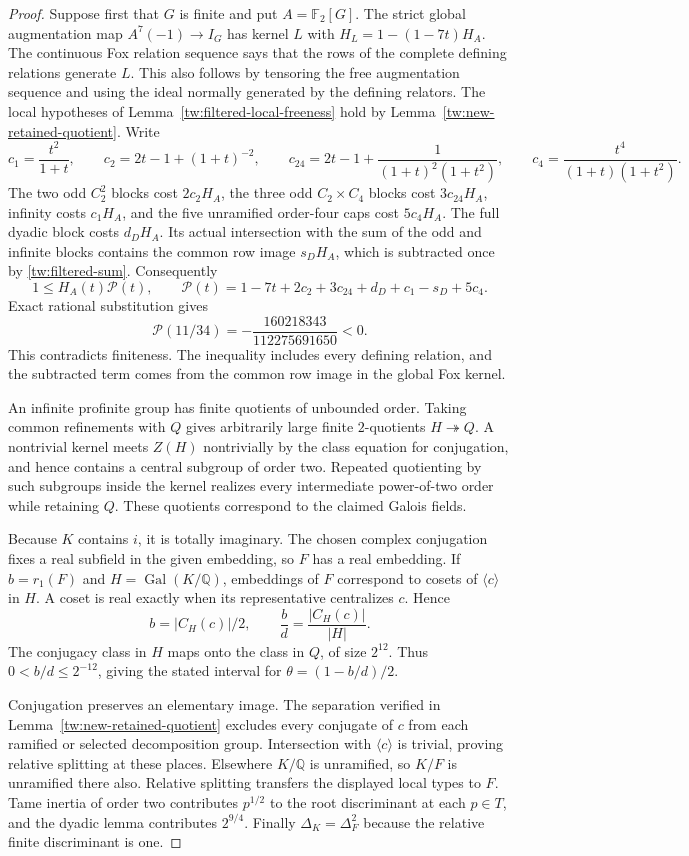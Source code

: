 \begin{proof}
Suppose first that $G$ is finite and put $A=\mathbb F_2[G]$.
The strict global augmentation map $A^7(-1)\to I_G$ has kernel $L$ with
$H_L=1-(1-7t)H_A$. The continuous Fox relation sequence says that the
rows of the complete defining relations generate $L$. This also follows
by tensoring the free augmentation sequence and using the ideal normally
generated by the defining relators.
The local hypotheses of Lemma~\ref{tw:filtered-local-freeness} hold by
Lemma~\ref{tw:new-retained-quotient}. Write
\[
 c_1=\frac{t^2}{1+t},\qquad c_2=2t-1+(1+t)^{-2},\qquad
 c_{24}=2t-1+\frac1{(1+t)^2(1+t^2)},\qquad
 c_4=\frac{t^4}{(1+t)(1+t^2)}.
\]
The two odd $C_2^2$ blocks cost $2c_2H_A$, the three odd
$C_2\times C_4$ blocks cost $3c_{24}H_A$, infinity costs $c_1H_A$,
and the five unramified order-four caps cost $5c_4H_A$.
The full dyadic block costs $d_DH_A$. Its actual intersection with the
sum of the odd and infinite blocks contains the common row image
$s_DH_A$, which is subtracted once by \eqref{tw:filtered-sum}.
Consequently
\[
 1\le H_A(t)\mathcal P(t),\qquad
 \mathcal P(t)=1-7t+2c_2+3c_{24}+d_D+c_1-s_D+5c_4.
\]
Exact rational substitution gives
\[
 \mathcal P(11/34)=-\frac{160218343}{112275691650}<0.
\]
This contradicts finiteness. The inequality includes every defining
relation, and the subtracted term comes from the common row image in the
global Fox kernel.

An infinite profinite group has finite quotients of unbounded order.
Taking common refinements with $Q$ gives arbitrarily large finite
$2$-quotients $H\twoheadrightarrow Q$. A nontrivial kernel meets $Z(H)$
nontrivially by the class equation for conjugation, and hence contains a
central subgroup of order two. Repeated quotienting by such subgroups
inside the kernel realizes every intermediate power-of-two order while
retaining $Q$. These quotients correspond to the claimed Galois fields.

Because $K$ contains $i$, it is totally imaginary. The chosen complex
conjugation fixes a real subfield in the given embedding, so $F$ has a
real embedding. If $b=r_1(F)$ and $H=\operatorname{Gal}(K/\mathbb Q)$,
embeddings of $F$ correspond to cosets of $\langle c\rangle$ in $H$.
A coset is real exactly when its representative centralizes $c$. Hence
\[
 b=|C_H(c)|/2,\qquad \frac bd=\frac{|C_H(c)|}{|H|}.
\]
The conjugacy class in $H$ maps onto the class in $Q$, of size $2^{12}$.
Thus $0<b/d\le2^{-12}$, giving the stated interval for
$\theta=(1-b/d)/2$.

Conjugation preserves an elementary image. The separation verified in
Lemma~\ref{tw:new-retained-quotient} excludes every conjugate
of $c$ from each ramified or selected decomposition group. Intersection
with $\langle c\rangle$ is trivial, proving relative splitting at these
places. Elsewhere $K/\mathbb Q$ is unramified, so $K/F$ is unramified
there also. Relative splitting transfers the displayed local types to $F$.
Tame inertia of order two contributes $p^{1/2}$ to the root discriminant
at each $p\in T$, and the dyadic lemma contributes $2^{9/4}$. Finally
$\Delta_K=\Delta_F^2$ because the relative finite discriminant is one.
\end{proof}
